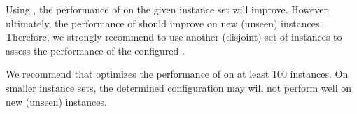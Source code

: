 \begin{note}
Using \piclasp{}, the performance of \clasp{} on the given instance set will improve.
However ultimately, the performance of \clasp{} should improve on new (unseen) instances.
Therefore, we strongly recommend to use another (disjoint) set of instances to assess the performance of the configured \clasp{}.
\end{note}

\begin{note}
We recommend that \piclasp{} optimizes the performance of \clasp{} on at least $100$ instances.
On smaller instance sets, the determined configuration may will not perform well on new (unseen) instances.
\end{note}


